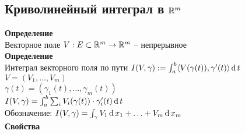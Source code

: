 \documentclass[12pt]{article}
\begin{document}
\subsection{Криволинейный интеграл в $\mathbb{R}^m$}
\textbf{Определение}\\
Векторное поле $V: E \subset \mathbb{R}^m \rightarrow \mathbb{R}^m$ -- непрерывное\\
\textbf{Определение}\\
Интеграл векторного поля по пути $I(V, \gamma) := \int_a^b \langle V(\gamma(t)), \gamma'(t)\rangle \operatorname{d} t$
$V = (V_1, \ldots, V_m)$\\
$\gamma(t) = (\gamma_1(t), \ldots, \gamma_m(t))$\\
$I(V, \gamma) = \int_a^b \sum_i V_i(\gamma(t))\cdot \gamma'_i(t) \operatorname{d} t$\\
Обозначение: $I(V, \gamma) = \int_\gamma V_1\operatorname{d} x_1 + \ldots + V_m\operatorname{d} x_m$\\
\textbf{Свойства}
\end{document}
